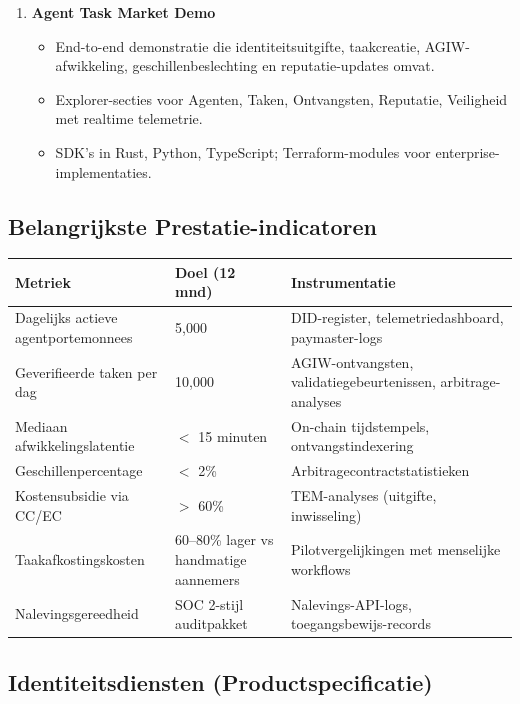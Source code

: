 \documentclass[11pt]{article}
\begin{document}
\begin{enumerate}[label=\textbf{D\arabic*.}, leftmargin=*]
  \item \textbf{Agent Task Market Demo}
  \begin{itemize}[noitemsep]
    \item End-to-end demonstratie die identiteitsuitgifte, taakcreatie, AGIW-afwikkeling, geschillenbeslechting en reputatie-updates omvat.
    \item Explorer-secties voor Agenten, Taken, Ontvangsten, Reputatie, Veiligheid met realtime telemetrie.
    \item SDK's in Rust, Python, TypeScript; Terraform-modules voor enterprise-implementaties.
  \end{itemize}
\end{enumerate}

\subsection{Belangrijkste Prestatie-indicatoren}
\begin{longtable}{@{}p{}p{}p{}@{}}
\toprule
\textbf{Metriek} & \textbf{Doel (12 mnd)} & \textbf{Instrumentatie} \\\midrule
Dagelijks actieve agentportemonnees & 5,000 & DID-register, telemetriedashboard, paymaster-logs \\
Geverifieerde taken per dag & 10,000 & AGIW-ontvangsten, validatiegebeurtenissen, arbitrage-analyses \\
Mediaan afwikkelingslatentie & $<$ 15 minuten & On-chain tijdstempels, ontvangstindexering \\
Geschillenpercentage & $<$ 2\% & Arbitragecontractstatistieken \\
Kostensubsidie via CC/EC & $>$ 60\% & TEM-analyses (uitgifte, inwisseling) \\
Taakafkostingskosten & 60--80\% lager vs handmatige aannemers & Pilotvergelijkingen met menselijke workflows \\
Nalevingsgereedheid & SOC 2-stijl auditpakket & Nalevings-API-logs, toegangsbewijs-records \\
\bottomrule
\end{longtable}

\subsection{Identiteitsdiensten (Productspecificatie)}
\label{sec:identity-spec}
\end{document}
